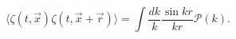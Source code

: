 \begin{equation}\label{eq:power}
\langle\zeta(t,\vec{x})\zeta(t,\vec{x}+\vec{r})\rangle=
    \int \frac{dk}{k} \frac{\sin kr}{kr} \mathcal{P}(k).
\end{equation}

